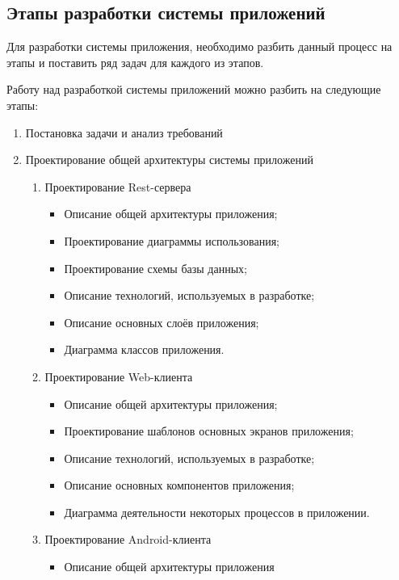 \subsection{Этапы разработки системы приложений}\label{subsec:2-dev-stages}\indent

Для разработки системы приложения, необходимо разбить данный процесс на этапы и поставить ряд задач для каждого из этапов.

Работу над разработкой системы приложений можно разбить на следующие этапы:

\begin{enumerate}
    \item Постановка задачи и анализ требований
    \item Проектирование общей архитектуры системы приложений
    \begin{enumerate}
        \item Проектирование Rest-сервера
        \begin{itemize}
            \item Описание общей архитектуры приложения;
            \item Проектирование диаграммы использования;
            \item Проектирование схемы базы данных;
            \item Описание технологий, используемых в разработке;
            \item Описание основных слоёв приложения;
            \item Диаграмма классов приложения.
        \end{itemize}
        \item Проектирование Web-клиента
        \begin{itemize}
            \item Описание общей архитектуры приложения;
            \item Проектирование шаблонов основных экранов приложения;
            \item Описание технологий, используемых в разработке;
            \item Описание основных компонентов приложения;
            \item Диаграмма деятельности некоторых процессов в приложении.
        \end{itemize}
        \item Проектирование Android-клиента
        \begin{itemize}
            \item Описание общей архитектуры приложения

\end{itemize}
\end{enumerate}
\end{enumerate}
